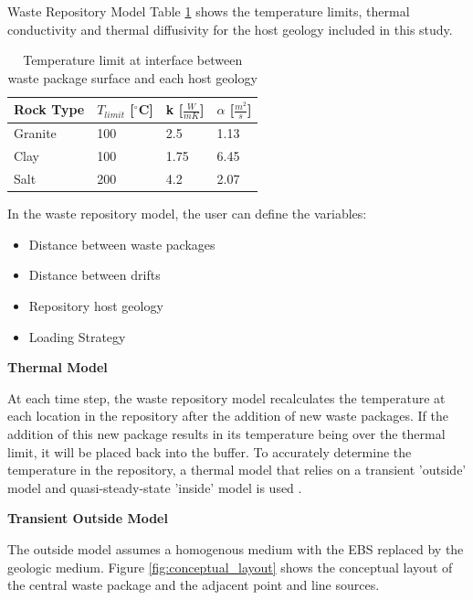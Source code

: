 \documentclass[final]{beamer}
\newlength{\onecolwid}
\newlength{\threecolwid}
\begin{document}
\begin{frame}[t]
\begin{columns}[t,totalwidth=\threecolwid]
\begin{column}{\onecolwid}
\begin{block}{Waste Repository Model}
Table \ref{tab:temp_limit} shows the temperature limits, thermal conductivity 
and thermal diffusivity for the host geology included in this study. 

\begin{table}[]
	\label{tab:temp_limit}
	\caption{Temperature limit at interface between waste package surface 
	and each host geology \cite{sutton_investigations_2011}}
	\begin{tabular}{|l|l|l|l|}
	\hline
	Rock Type & $T_{limit}$ [$^\circ$C] & k [$\frac{W}{mK}$] &  $\alpha$ [$\frac{m^2}{s}$]  \\ \hline
	Granite   & 100 & 2.5  & 1.13\\ \hline
	Clay      & 100 & 1.75 & 6.45\\ \hline
	Salt      & 200 & 4.2  & 2.07\\ \hline
	\end{tabular}
\end{table}

In the waste repository model, the user can define the variables: 
	\begin{itemize}
		\item Distance between waste packages
		\item Distance between drifts 
		\item Repository host geology 
		\item Loading Strategy 
	\end{itemize}

\textbf{Thermal Model}

At each time step, the waste repository model recalculates the temperature at each 
location in the repository after the addition of new waste packages. 
If the addition of this new package results in its temperature being over the thermal 
limit, it will be placed back into the buffer.  
To accurately determine the temperature in the repository, a thermal model that 
relies on a transient 'outside' model and quasi-steady-state 'inside' model is used
\cite{sutton_investigations_2011}. 

\textbf{Transient Outside Model}

The outside model assumes a homogenous medium with the \gls{EBS} replaced by the 
geologic medium. 
Figure \ref{fig:conceptual_layout} shows the conceptual layout of the central waste 
package and the adjacent point and line sources. 


\end{block}
\end{column}
\end{columns}
\end{frame}
\end{document}

